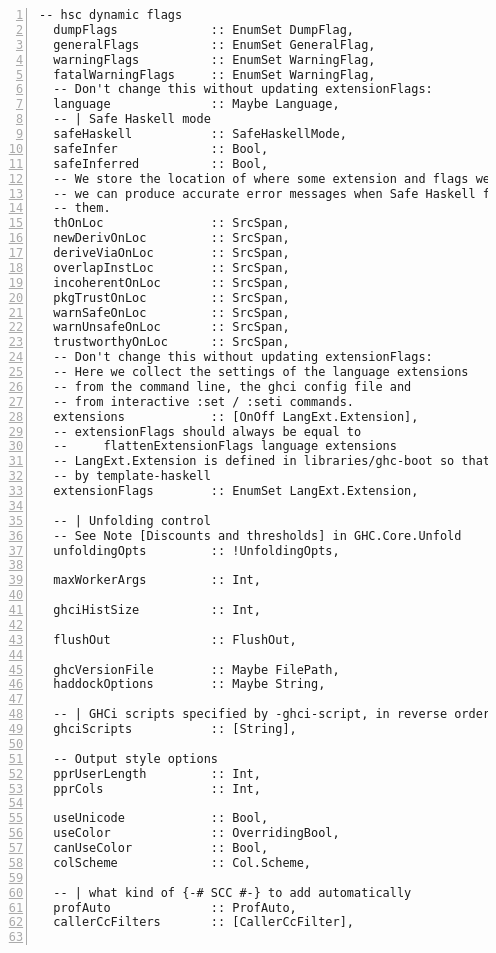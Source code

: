 \documentclass[en]{pracamgr}
\begin{document}
\begin{lstlisting}[numbers=left,stepnumber=1]
  -- hsc dynamic flags
  dumpFlags             :: EnumSet DumpFlag,
  generalFlags          :: EnumSet GeneralFlag,
  warningFlags          :: EnumSet WarningFlag,
  fatalWarningFlags     :: EnumSet WarningFlag,
  -- Don't change this without updating extensionFlags:
  language              :: Maybe Language,
  -- | Safe Haskell mode
  safeHaskell           :: SafeHaskellMode,
  safeInfer             :: Bool,
  safeInferred          :: Bool,
  -- We store the location of where some extension and flags were turned on so
  -- we can produce accurate error messages when Safe Haskell fails due to
  -- them.
  thOnLoc               :: SrcSpan,
  newDerivOnLoc         :: SrcSpan,
  deriveViaOnLoc        :: SrcSpan,
  overlapInstLoc        :: SrcSpan,
  incoherentOnLoc       :: SrcSpan,
  pkgTrustOnLoc         :: SrcSpan,
  warnSafeOnLoc         :: SrcSpan,
  warnUnsafeOnLoc       :: SrcSpan,
  trustworthyOnLoc      :: SrcSpan,
  -- Don't change this without updating extensionFlags:
  -- Here we collect the settings of the language extensions
  -- from the command line, the ghci config file and
  -- from interactive :set / :seti commands.
  extensions            :: [OnOff LangExt.Extension],
  -- extensionFlags should always be equal to
  --     flattenExtensionFlags language extensions
  -- LangExt.Extension is defined in libraries/ghc-boot so that it can be used
  -- by template-haskell
  extensionFlags        :: EnumSet LangExt.Extension,

  -- | Unfolding control
  -- See Note [Discounts and thresholds] in GHC.Core.Unfold
  unfoldingOpts         :: !UnfoldingOpts,

  maxWorkerArgs         :: Int,

  ghciHistSize          :: Int,

  flushOut              :: FlushOut,

  ghcVersionFile        :: Maybe FilePath,
  haddockOptions        :: Maybe String,

  -- | GHCi scripts specified by -ghci-script, in reverse order
  ghciScripts           :: [String],

  -- Output style options
  pprUserLength         :: Int,
  pprCols               :: Int,

  useUnicode            :: Bool,
  useColor              :: OverridingBool,
  canUseColor           :: Bool,
  colScheme             :: Col.Scheme,

  -- | what kind of {-# SCC #-} to add automatically
  profAuto              :: ProfAuto,
  callerCcFilters       :: [CallerCcFilter],


\end{lstlisting}
\end{document}
